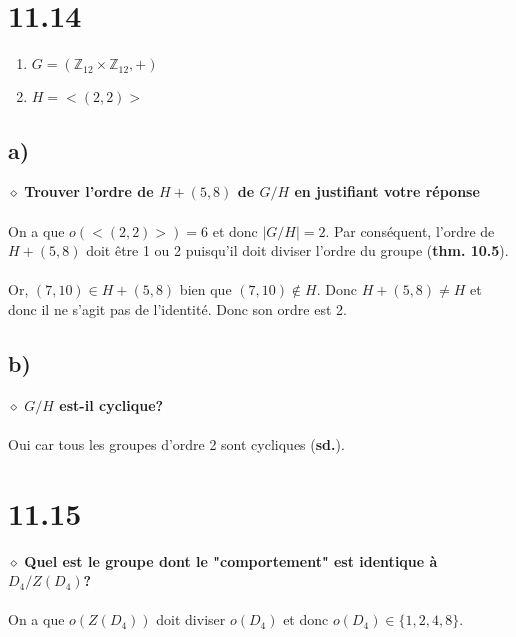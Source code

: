 \documentclass[a4paper,10pt]{article}
\begin{document}
\section*{11.14}
\begin{enumerate}
	\item $G = (\mathbb{Z}_{12} \times \mathbb{Z}_{12}, +)$
	\item $H = <(2,2)>$
\end{enumerate} 
\subsection*{a)}
$\diamond$ \textbf{Trouver l'ordre de $H + (5,8)$ de $G/H$ en justifiant votre réponse}
\\
\\
On a que $o(<(2,2)>) = 6$ et donc $|G/H| = 2$. Par conséquent, l'ordre de $H + (5,8)$ doit être 1 ou 2 puisqu'il doit diviser l'ordre du groupe (\textbf{thm. 10.5}). 
\\
\\
Or, $(7,10) \in H + (5,8)$ bien que $(7,10) \not \in H$. Donc $H + (5,8) \not = H$ et donc il ne s'agit pas de l'identité. Donc son ordre est 2.
\subsection*{b)}
$\diamond$ \textbf{$G/H$ est-il cyclique?}
\\
\\
Oui car tous les groupes d'ordre 2 sont cycliques (\textbf{sd.}).

\section*{11.15}
$\diamond$ \textbf{Quel est le groupe dont le "comportement" est identique à $D_4/Z(D_4)$?}
\\
\\
On a que $o(Z(D_4))$ doit diviser $o(D_4)$ et donc $o(D_4) \in \{1,2,4,8\}$.
\end{document}
